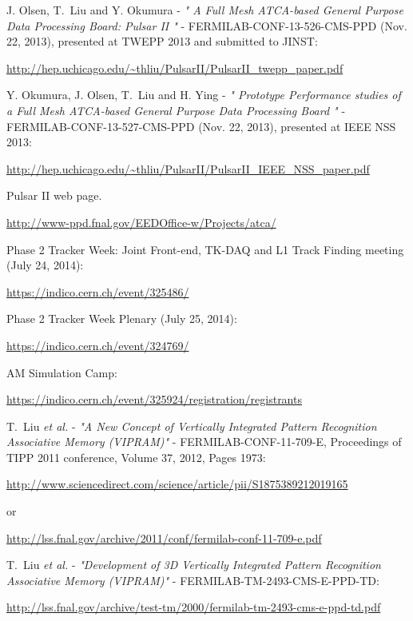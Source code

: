 \documentclass{cmspaper}
\begin{document}
\begin{thebibliography}{99}
 J. Olsen, T.~Liu and Y. Okumura - {\it "
A Full Mesh ATCA-based General Purpose Data Processing Board: Pulsar II
"} - FERMILAB-CONF-13-526-CMS-PPD (Nov. 22, 2013), presented at TWEPP 2013 and submitted to JINST:

\url{http://hep.uchicago.edu/~thliu/PulsarII/PulsarII_twepp_paper.pdf}

 Y. Okumura, J. Olsen, T.~Liu and H. Ying - {\it "
Prototype Performance studies of a Full Mesh ATCA-based General Purpose Data Processing Board
"} - FERMILAB-CONF-13-527-CMS-PPD (Nov. 22, 2013), presented at IEEE NSS 2013: 

\url{http://hep.uchicago.edu/~thliu/PulsarII/PulsarII_IEEE_NSS_paper.pdf}

  Pulsar II web page.

\url{http://www-ppd.fnal.gov/EEDOffice-w/Projects/atca/}

  Phase 2 Tracker Week: Joint Front-end, TK-DAQ and L1 Track Finding meeting (July 24, 2014):

\url{https://indico.cern.ch/event/325486/}

  Phase 2 Tracker Week Plenary (July 25, 2014):

\url{https://indico.cern.ch/event/324769/}

 AM Simulation Camp: 

\url{https://indico.cern.ch/event/325924/registration/registrants}

 T.~Liu {\it et al.} - {\it "A New Concept of Vertically Integrated Pattern Recognition Associative Memory (VIPRAM)"} - FERMILAB-CONF-11-709-E, Proceedings of TIPP 2011 conference, Volume 37, 2012, Pages 1973: 

\url{http://www.sciencedirect.com/science/article/pii/S1875389212019165}

or 

\url{http://lss.fnal.gov/archive/2011/conf/fermilab-conf-11-709-e.pdf}

 T.~Liu {\it et al.} - {\it "Development of 3D Vertically Integrated Pattern Recognition Associative Memory (VIPRAM)"} - FERMILAB-TM-2493-CMS-E-PPD-TD:

\url{http://lss.fnal.gov/archive/test-tm/2000/fermilab-tm-2493-cms-e-ppd-td.pdf}






\end{thebibliography}
\end{document}
